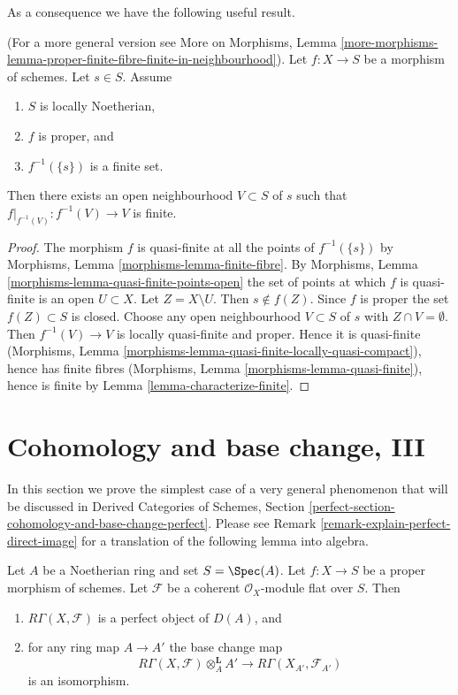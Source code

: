 \noindent
As a consequence we have the following useful result.

\begin{lemma}
\label{lemma-proper-finite-fibre-finite-in-neighbourhood}
(For a more general version see
More on Morphisms,
Lemma \ref{more-morphisms-lemma-proper-finite-fibre-finite-in-neighbourhood}).
Let $f : X \to S$ be a morphism of schemes.
Let $s \in S$.
Assume
\begin{enumerate}
\item $S$ is locally Noetherian,
\item $f$ is proper, and
\item $f^{-1}(\{s\})$ is a finite set.
\end{enumerate}
Then there exists an open neighbourhood $V \subset S$ of $s$
such that $f|_{f^{-1}(V)} : f^{-1}(V) \to V$ is finite.
\end{lemma}

\begin{proof}
The morphism $f$ is quasi-finite at all the points of $f^{-1}(\{s\})$
by Morphisms, Lemma \ref{morphisms-lemma-finite-fibre}.
By Morphisms, Lemma \ref{morphisms-lemma-quasi-finite-points-open} the
set of points at which $f$ is quasi-finite is an open $U \subset X$.
Let $Z = X \setminus U$. Then $s \not \in f(Z)$. Since $f$ is proper
the set $f(Z) \subset S$ is closed. Choose any open neighbourhood
$V \subset S$ of $s$ with $Z \cap V = \emptyset$. Then
$f^{-1}(V) \to V$ is locally quasi-finite and proper.
Hence it is quasi-finite
(Morphisms, Lemma \ref{morphisms-lemma-quasi-finite-locally-quasi-compact}),
hence has finite fibres
(Morphisms, Lemma \ref{morphisms-lemma-quasi-finite}), hence
is finite by Lemma \ref{lemma-characterize-finite}.
\end{proof}





\section{Cohomology and base change, III}
\label{section-cohomology-and-base-change-perfect}

\noindent
In this section we prove the simplest case of a very general phenomenon
that will be discussed in
Derived Categories of Schemes, Section
\ref{perfect-section-cohomology-and-base-change-perfect}.
Please see Remark \ref{remark-explain-perfect-direct-image} for a translation
of the following lemma into algebra.

\begin{lemma}
\label{lemma-perfect-direct-image}
Let $A$ be a Noetherian ring and set $S = \Spec(A)$. Let $f : X \to S$ be a
proper morphism of schemes. Let $\mathcal{F}$ be a coherent
$\mathcal{O}_X$-module flat over $S$. Then
\begin{enumerate}
\item $R\Gamma(X, \mathcal{F})$ is a perfect object of $D(A)$, and
\item for any ring map $A \to A'$ the base change map
$$
R\Gamma(X, \mathcal{F}) \otimes_A^{\mathbf{L}} A'
\longrightarrow
R\Gamma(X_{A'}, \mathcal{F}_{A'})
$$
is an isomorphism.
\end{enumerate}
\end{lemma}

